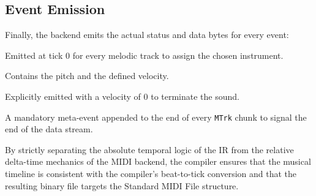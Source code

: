 \subsection{Event Emission}\label{detail-subsec:event-emission}

Finally, the backend emits the actual status and data bytes for every event:

 Emitted at tick 0 for every melodic track to assign the
chosen instrument.

 Contains the pitch and
the defined velocity.

 Explicitly
emitted with
a velocity of 0 to terminate the sound.

 A mandatory meta-event appended to the end of every \texttt{MTrk}
chunk to signal the end of the data stream.

By strictly separating the absolute temporal logic of the IR from the relative delta-time mechanics of the MIDI backend,
the compiler ensures that the musical timeline is consistent with the compiler's beat-to-tick conversion and
that the resulting binary file targets the Standard MIDI File structure.

